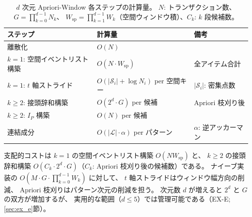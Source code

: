 \begin{table}[t]
\centering
\caption{$d$ 次元 Apriori-Window 各ステップの計算量。
$N$: トランザクション数、$G = \prod_{k=0}^{d-1} N_k$、
$W_{\mathrm{sp}} = \prod_{k=1}^{d-1} W_k$（空間ウィンドウ積）、$C_k$: $k$ 段候補数。}
\label{tab:complexity}
\small
\begin{tabular}{lll}
\toprule
ステップ & 計算量 & 備考 \\
\midrule
離散化 & $O(N)$ & \\
$k=1$: 空間イベントリスト構築 & $O(N \cdot W_{\mathrm{sp}})$ & 全アイテム合計 \\
$k=1$: $t$ 軸ストライド & $O(|\mathcal{S}_i| + \log N_i)$ per 空間キー & $|\mathcal{S}_i|$: 密集点数 \\
$k \geq 2$: 接頭辞和構築 & $O(2^d \cdot G)$ per 候補 & Apriori 枝刈り後 \\
$k \geq 2$: $I_P$ 構築 & $O(N)$ per 候補 & \\
連結成分 & $O(|\mathcal{L}| \cdot \alpha)$ per パターン & $\alpha$: 逆アッカーマン \\
\bottomrule
\end{tabular}
\end{table}

支配的コストは $k=1$ の空間イベントリスト構築 $O(N W_{\mathrm{sp}})$ と、
$k \geq 2$ の接頭辞和構築 $O(C_k \cdot 2^d \cdot G)$（$C_k$: Apriori 枝刈り後の候補数）である。
ナイーブ実装の $O\!\left(M \cdot G \cdot \prod_{k=0}^{d-1} W_k\right)$ に対して、
$t$ 軸ストライドはウィンドウ幅方向の削減、
Apriori 枝刈りはパターン次元の削減を担う。
次元数 $d$ が増えると $2^d$ と $G$ の双方が増加するが、
実用的な範囲（$d \leq 5$）では管理可能である（EX-E; \ref{sec:ex_e}節）。
